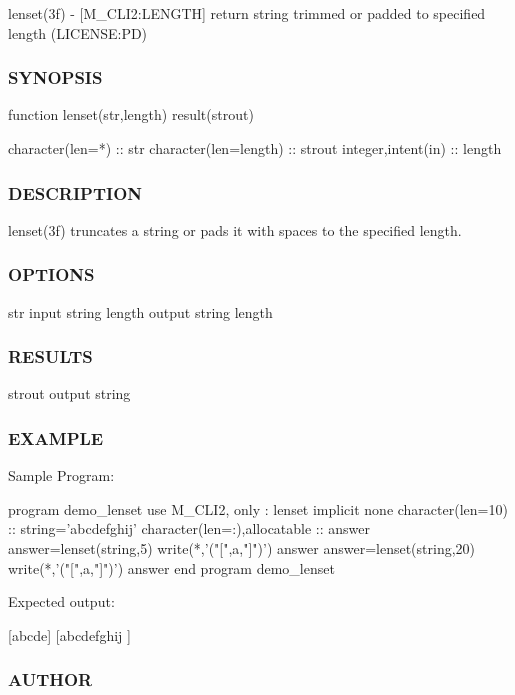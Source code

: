 lenset(3f) -\/ \mbox{[}M\+\_\+\+C\+L\+I2\+:L\+E\+N\+G\+TH\mbox{]} return string trimmed or padded to specified length (L\+I\+C\+E\+N\+SE\+:PD) 

\subsubsection*{S\+Y\+N\+O\+P\+S\+IS}

\begin{DoxyVerb}function lenset(str,length) result(strout)

 character(len=*)                     :: str
 character(len=length)                :: strout
 integer,intent(in)                   :: length
\end{DoxyVerb}
 \subsubsection*{D\+E\+S\+C\+R\+I\+P\+T\+I\+ON}

lenset(3f) truncates a string or pads it with spaces to the specified length. \subsubsection*{O\+P\+T\+I\+O\+NS}

str input string length output string length \subsubsection*{R\+E\+S\+U\+L\+TS}

strout output string \subsubsection*{E\+X\+A\+M\+P\+LE}

Sample Program\+: \begin{DoxyVerb}program demo_lenset
 use M_CLI2, only : lenset
 implicit none
 character(len=10)            :: string='abcdefghij'
 character(len=:),allocatable :: answer
    answer=lenset(string,5)
    write(*,'("[",a,"]")') answer
    answer=lenset(string,20)
    write(*,'("[",a,"]")') answer
end program demo_lenset
\end{DoxyVerb}


Expected output\+:

\mbox{[}abcde\mbox{]} \mbox{[}abcdefghij \mbox{]}

\subsubsection*{A\+U\+T\+H\+OR}

